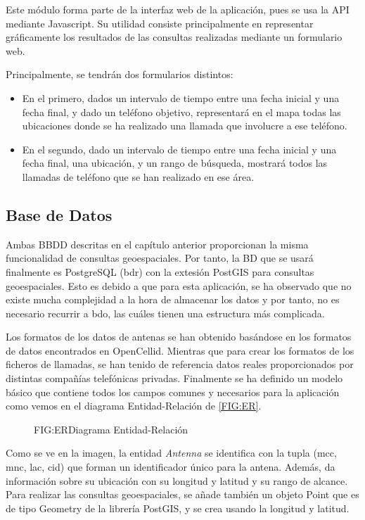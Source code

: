     Este módulo forma parte de la interfaz web de la aplicación, pues se usa la API mediante Javascript. Su utilidad consiste principalmente en representar gráficamente los resultados de las consultas realizadas mediante un formulario web.
    
    Principalmente, se tendrán dos formularios distintos:
    \begin{itemize}
      \item En el primero, dados un intervalo de tiempo entre una fecha inicial y una fecha final, y dado un teléfono objetivo, representará en el mapa todas las ubicaciones donde se ha realizado una llamada que involucre a ese teléfono.
      
      \item En el segundo, dado un intervalo de tiempo entre una fecha inicial y una fecha final, una ubicación, y un rango de búsqueda, mostrará todos las llamadas de teléfono que se han realizado en ese área. 
    \end{itemize}
    
  \subsection{Base de Datos}
    Ambas BBDD descritas en el capítulo anterior proporcionan la misma funcionalidad de consultas geoespaciales.
    Por tanto, la BD que se usará finalmente es PostgreSQL (\ac{bdr}) con la extesión PostGIS para consultas geoespaciales. Esto es debido a que para esta aplicación, se ha observado que no existe mucha complejidad a la hora de almacenar los datos y por tanto, no es necesario recurrir a \ac{bdo}, las cuáles tienen una estructura más complicada. 

    Los formatos de los datos de antenas se han obtenido basándose en los formatos de datos encontrados en OpenCellid\cite{opencellid}.
    Mientras que para crear los formatos de los ficheros de llamadas, se han tenido de referencia datos reales proporcionados por distintas compañías telefónicas privadas.
    Finalmente se ha definido un modelo básico que contiene todos los campos comunes y necesarios para la aplicación como vemos en el diagrama Entidad-Relación de \ref{FIG:ER}.
    
    \begin{figure}[Diagrama Entidad-Relación]{FIG:ER}{Diagrama Entidad-Relación}
    \end{figure}
  
    Como se ve en la imagen, la entidad \textit{Antenna} se identifica con la tupla (mcc, mnc, lac, cid) que forman un identificador único para la antena. Además, da información sobre su ubicación con su longitud y latitud y su rango de alcance. Para realizar las consultas geoespaciales, se añade también un objeto Point que es de tipo Geometry de la librería PostGIS, y se crea usando la longitud y latitud.
    
